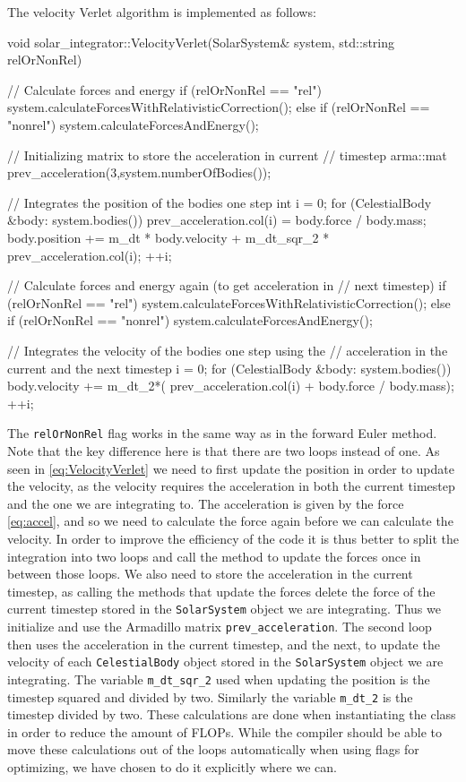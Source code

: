 \documentclass[reprint,english,notitlepage]{revtex4-1}  %
\begin{document}
The velocity Verlet algorithm is implemented as follows:

\begin{cpp}
void solar_integrator::VelocityVerlet(SolarSystem& system,
									  std::string relOrNonRel) {
  // Calculate forces and energy
  if (relOrNonRel == "rel") {
    system.calculateForcesWithRelativisticCorrection();
  } else if (relOrNonRel == "nonrel") {
    system.calculateForcesAndEnergy();
  }

  // Initializing matrix to store the acceleration in current
  // timestep
  arma::mat prev_acceleration(3,system.numberOfBodies());

  // Integrates the position of the bodies one step
  int i = 0;
  for (CelestialBody &body: system.bodies()) {
    prev_acceleration.col(i) = body.force / body.mass;
    body.position += m_dt * body.velocity
    				 + m_dt_sqr_2 * prev_acceleration.col(i);
    ++i;
  }

  // Calculate forces and energy again (to get acceleration in
  // next timestep)
  if (relOrNonRel == "rel") {
    system.calculateForcesWithRelativisticCorrection();
  } else if (relOrNonRel == "nonrel") {
    system.calculateForcesAndEnergy();
  }

  // Integrates the velocity of the bodies one step using the
  // acceleration in the current and the next timestep
  i = 0;
  for (CelestialBody &body: system.bodies()) {
    body.velocity += m_dt_2*( prev_acceleration.col(i)
    				 + body.force / body.mass);
    ++i;
  }
}
\end{cpp}

The \verb+relOrNonRel+ flag works in the same way as in the forward Euler method. Note that the key difference here is that there are two loops instead of one. As seen in \eqref{eq:VelocityVerlet} we need to first update the position in order to update the velocity, as the velocity requires the acceleration in both the current timestep and the one we are integrating to. The acceleration is given by the force \eqref{eq:accel}, and so we need to calculate the force again before we can calculate the velocity. In order to improve the efficiency of the code it is thus better to split the integration into two loops and call the method to update the forces once in between those loops. We also need to store the acceleration in the current timestep, as calling the methods that update the forces delete the force of the current timestep stored in the \verb+SolarSystem+ object we are integrating. Thus we initialize and use the Armadillo \citep{Armadillo} matrix \verb+prev_acceleration+. The second loop then uses the acceleration in the current timestep, and the next, to update the velocity of each \verb+CelestialBody+ object stored in the \verb+SolarSystem+ object we are integrating. The variable \verb+m_dt_sqr_2+ used when updating the position is the timestep squared and divided by two. Similarly the variable \verb+m_dt_2+ is the timestep divided by two. These calculations are done when instantiating the class in order to reduce the amount of FLOPs. While the compiler should be able to move these calculations out of the loops automatically when using flags for optimizing, we have chosen to do it explicitly where we can.
\end{document}
